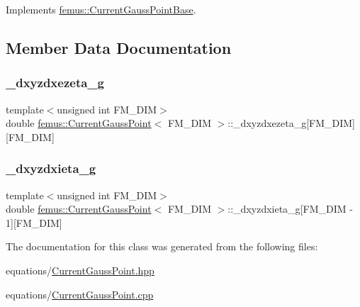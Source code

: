 Implements \mbox{\hyperlink{classfemus_1_1_current_gauss_point_base_aec970c4eef875b43169cb74674276e29}{femus\+::\+Current\+Gauss\+Point\+Base}}.



\subsection{Member Data Documentation}
\mbox{\label{classfemus_1_1_current_gauss_point_ab108c2df3569ff9b84311043add21244}} 
\subsubsection{\texorpdfstring{\+\_\+dxyzdxezeta\+\_\+g}{\_dxyzdxezeta\_g}}
{\footnotesize\ttfamily template$<$unsigned int F\+M\+\_\+\+D\+IM$>$ \\
double \mbox{\hyperlink{classfemus_1_1_current_gauss_point}{femus\+::\+Current\+Gauss\+Point}}$<$ F\+M\+\_\+\+D\+IM $>$\+::\+\_\+dxyzdxezeta\+\_\+g\mbox{[}F\+M\+\_\+\+D\+IM\mbox{]}\mbox{[}F\+M\+\_\+\+D\+IM\mbox{]}\hspace{0.3cm}{\ttfamily [protected]}}

\mbox{\label{classfemus_1_1_current_gauss_point_aa7c40a89d85a264566e495f775ed0977}} 
\subsubsection{\texorpdfstring{\+\_\+dxyzdxieta\+\_\+g}{\_dxyzdxieta\_g}}
{\footnotesize\ttfamily template$<$unsigned int F\+M\+\_\+\+D\+IM$>$ \\
double \mbox{\hyperlink{classfemus_1_1_current_gauss_point}{femus\+::\+Current\+Gauss\+Point}}$<$ F\+M\+\_\+\+D\+IM $>$\+::\+\_\+dxyzdxieta\+\_\+g\mbox{[}F\+M\+\_\+\+D\+IM -\/ 1\mbox{]}\mbox{[}F\+M\+\_\+\+D\+IM\mbox{]}\hspace{0.3cm}{\ttfamily [protected]}}



The documentation for this class was generated from the following files\+:\begin{DoxyCompactItemize}
\item 
equations/\mbox{\hyperlink{_current_gauss_point_8hpp}{Current\+Gauss\+Point.\+hpp}}\item 
equations/\mbox{\hyperlink{_current_gauss_point_8cpp}{Current\+Gauss\+Point.\+cpp}}\end{DoxyCompactItemize}
